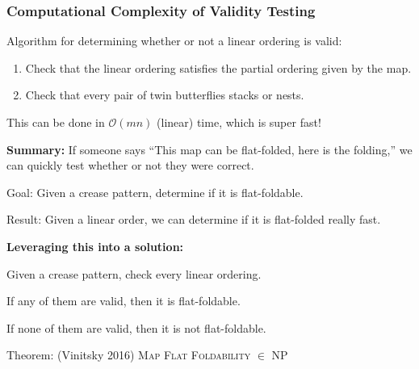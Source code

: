 \documentclass{beamer}
\begin{document}

\begin{frame}
\frametitle{Computational Complexity of Validity Testing}

Algorithm for determining whether or not a linear ordering is valid:

\pause

\begin{enumerate}
\item Check that the linear ordering satisfies the partial ordering given by the map.
\pause
\item Check that every pair of twin butterflies stacks or nests.
\end{enumerate}

\bigskip

\pause

This can be done in $\mathcal{O}(mn)$ (linear) time, which is super fast!

\bigskip

\pause

\textbf{Summary:} If someone says ``This map can be flat-folded, here is the folding,'' we can quickly test whether or not they were correct.

\end{frame}


\begin{frame}

\begin{block}{Goal:}
Given a crease pattern, determine if it is flat-foldable.
\end{block}

\begin{block}{Result:}
Given a linear order, we can determine if it is flat-folded really fast.
\end{block}

\medskip

\textbf{Leveraging this into a solution:} \\

\smallskip

Given a crease pattern, check every linear ordering. \\

\smallskip

If any of them are valid, then it is flat-foldable. \\

\smallskip

If none of them are valid, then it is not flat-foldable.

\begin{block}{Theorem: (Vinitsky 2016)}
\textsc{Map Flat Foldability} $\in$ NP
\end{block}

\end{frame}
\end{document}
